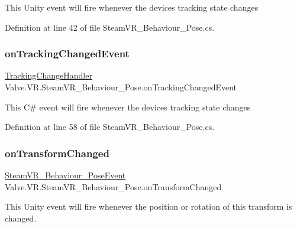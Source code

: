 This Unity event will fire whenever the device\textquotesingle{}s tracking state changes 



Definition at line 42 of file Steam\+V\+R\+\_\+\+Behaviour\+\_\+\+Pose.\+cs.

\mbox{\label{class_valve_1_1_v_r_1_1_steam_v_r___behaviour___pose_ae3372c5ebd6a668a5d100243d58a2e45}} 
\subsubsection{\texorpdfstring{onTrackingChangedEvent}{onTrackingChangedEvent}}
{\footnotesize\ttfamily \mbox{\hyperlink{class_valve_1_1_v_r_1_1_steam_v_r___behaviour___pose_a699268c8115abe175fc4cbd41cb99c11}{Tracking\+Change\+Handler}} Valve.\+V\+R.\+Steam\+V\+R\+\_\+\+Behaviour\+\_\+\+Pose.\+on\+Tracking\+Changed\+Event}



This C\# event will fire whenever the device\textquotesingle{}s tracking state changes 



Definition at line 58 of file Steam\+V\+R\+\_\+\+Behaviour\+\_\+\+Pose.\+cs.

\mbox{\label{class_valve_1_1_v_r_1_1_steam_v_r___behaviour___pose_a1d23c9fc3364bc8d9a2e2047af2e2e92}} 
\subsubsection{\texorpdfstring{onTransformChanged}{onTransformChanged}}
{\footnotesize\ttfamily \mbox{\hyperlink{class_valve_1_1_v_r_1_1_steam_v_r___behaviour___pose_event}{Steam\+V\+R\+\_\+\+Behaviour\+\_\+\+Pose\+Event}} Valve.\+V\+R.\+Steam\+V\+R\+\_\+\+Behaviour\+\_\+\+Pose.\+on\+Transform\+Changed}



This Unity event will fire whenever the position or rotation of this transform is changed. 



